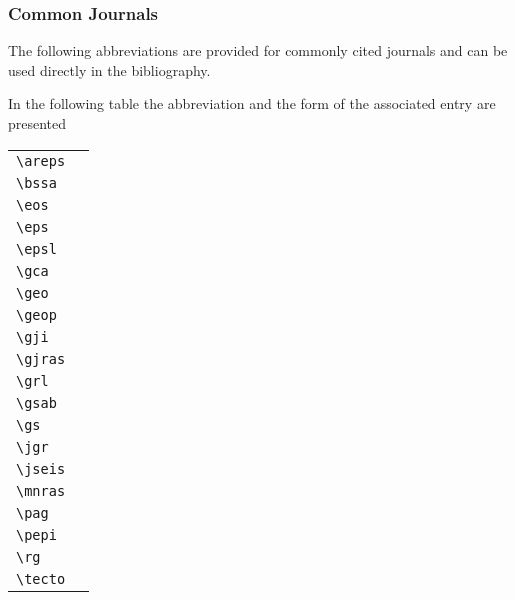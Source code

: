 \subsubsection{Common Journals}

The following abbreviations are provided for commonly cited
journals and can be used directly in the bibliography.

In the following table the abbreviation and the form of the
associated entry are presented
\newline
\begin{tabular}{ll}
\verb"\areps" & \areps{} \\
\verb"\bssa"  & \bssa{} \\
\verb"\eos"   & \eos{}  \\
\verb"\eps"   & \eps{} \\
\verb"\epsl"  & \epsl{} \\
\verb"\gca"   & \gca{} \\
\verb"\geo"   & \geo{} \\
\verb"\geop"  & \geop{} \\
\verb"\gji"   & \gji{} \\
\verb"\gjras" & \gjras{} \\
\verb"\grl"   & \grl{} \\
\verb"\gsab"  & \gsab{} \\
\verb"\gs"    & \gs{} \\
\verb"\jgr"   & \jgr{} \\
\verb"\jseis" & \jseis{} \\
\verb"\mnras" & \mnras{} \\
\verb"\pag"   & \pag{} \\
\verb"\pepi"  & \pepi{} \\
\verb"\rg"    & \rg{} \\
\verb"\tecto" & \tecto{} \\
\end{tabular}
%
%
